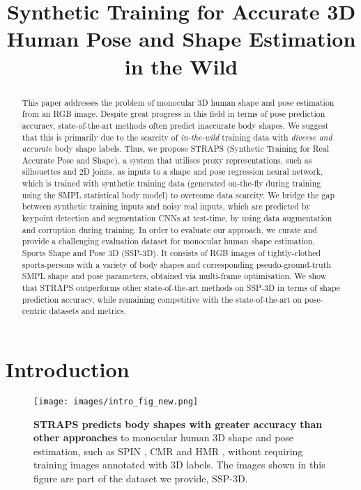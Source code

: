 \documentclass{bmvc2k}
\title{Synthetic Training for Accurate 3D Human Pose and Shape Estimation in the Wild}
\begin{document}
\maketitle
\begin{abstract}
This paper addresses the problem of monocular 3D human shape and pose estimation from an RGB image. Despite great progress in this field in terms of pose prediction accuracy, state-of-the-art methods often predict inaccurate body shapes. We suggest that this is primarily due to the scarcity of \textit{in-the-wild} training data with \textit{diverse and accurate} body shape labels. Thus, we propose STRAPS (Synthetic Training for Real Accurate Pose and Shape), a system that utilises proxy representations, such as silhouettes and 2D joints, as inputs to a shape and pose regression neural network, which is trained with synthetic training data (generated on-the-fly during training using the SMPL statistical body model) to overcome data scarcity. We bridge the gap between synthetic training inputs and noisy real inputs, which are predicted by keypoint detection and segmentation CNNs at test-time, by using data augmentation and corruption during training. In order to evaluate our approach, we curate and provide a challenging evaluation dataset for monocular human shape estimation, Sports Shape and Pose 3D (SSP-3D). It consists of RGB images of tightly-clothed sports-persons with a variety of body shapes and corresponding pseudo-ground-truth SMPL shape and pose parameters, obtained via multi-frame optimisation. We show that STRAPS outperforms other state-of-the-art methods on SSP-3D in terms of shape prediction accuracy, while remaining competitive with the state-of-the-art on pose-centric datasets and metrics.
\end{abstract}

\section{Introduction}
\label{sec:intro}

\begin{figure}[t]
    \centering
    \texttt{[image: images/intro\_fig\_new.png]}
    \caption{\textbf{STRAPS predicts body shapes with greater accuracy than other approaches} to monocular human 3D shape and pose estimation, such as SPIN \cite{kolotouros2019spin}, CMR \cite{kolotouros2019cmr} and HMR \cite{hmrKanazawa17}, without requiring training images annotated with 3D labels. The images shown in this figure are part of the dataset we provide, SSP-3D.}
    \label{fig:intro_fig}
\end{figure}
\end{document}
